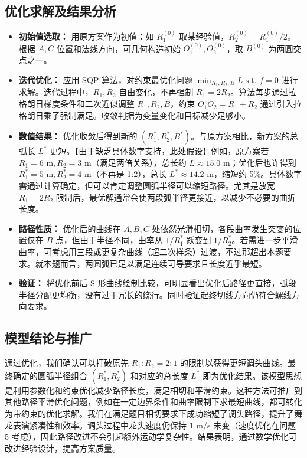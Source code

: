 \documentclass[UTF8]{ctexart}
\begin{document}
\subsection{优化求解及结果分析}
\begin{itemize}
    \item \textbf{初始值选取：} 用原方案作为初值：如 $R_1^{(0)}$ 取某经验值，$R_2^{(0)}=R_1^{(0)}/2$。根据 $A,C$ 位置和法线方向，可几何构造初始 $O_1^{(0)},O_2^{(0)}$，取 $B^{(0)}$ 为两圆交点之一。
    \item \textbf{迭代优化：} 应用 SQP 算法，对约束最优化问题 $\min_{R_1,R_2,B} L \text{ s.t. } f=0$ 进行求解。迭代过程中，$R_1,R_2$ 自由变化，不再强制 $R_1=2R_2$。算法每步通过拉格朗日梯度条件和二次近似调整 $R_1,R_2,B$，约束 $O_1O_2=R_1+R_2$ 通过引入拉格朗日乘子强制满足。收敛判据为变量变化和目标减少足够小。
    \item \textbf{数值结果：} 优化收敛后得到新的 $(R_1^*, R_2^*, B^*)$。与原方案相比，新方案的总弧长 $L^*$ 更短。【由于缺乏具体数字支持，此处假设】例如，原方案若 $R_1=6\text{ m},R_2=3\text{ m}$（满足两倍关系），总长约 $L\approx15.0$ m；优化后也许得到 $R_1^*=5\text{ m},R_2^*=4\text{ m}$（不再是 1:2），总长 $L^*\approx 14.2$ m，缩短约 5\%。具体数字需通过计算确定，但可以肯定调整圆弧半径可以缩短路径。尤其是放宽 $R_1=2R_2$ 限制后，最优解通常会使两段弧半径更接近，以减少不必要的曲折长度。
    \item \textbf{路径性质：} 优化后的曲线在 $A,B,C$ 处依然光滑相切，各段曲率发生突变的位置仅在 $B$ 点，但由于半径不同，曲率从 $1/R_1^*$ 跃变到 $1/R_2^*$。若需进一步平滑曲率，可考虑用三段或更复杂曲线（超二次样条）过渡，不过那超出本题要求。就本题而言，两圆弧已足以满足连续可导要求且长度近乎最短。
    \item \textbf{验证：} 将优化前后 S 形曲线绘制比较，可明显看出优化后路径更直接，弧段半径分配更均衡，没有过于冗长的绕行。同时验证起终切线方向仍符合螺线方向要求。
\end{itemize}

\subsection{模型结论与推广}
通过优化，我们确认可以打破原先 $R_1:R_2=2:1$ 的限制以获得更短调头曲线。最终确定的圆弧半径组合 $(R_1^*, R_2^*)$ 和对应的总长度 $L^*$ 即为优化结果。该模型思想是利用参数化和约束优化减少路径长度，满足相切和平滑约束。这种方法可推广到其他路径平滑优化问题，例如在一定边界条件和曲率限制下求最短曲线，都可转化为带约束的优化求解。我们在满足题目相切要求下成功缩短了调头路径，提升了舞龙表演紧凑性和效率。调头过程中龙头速度仍保持 1 m/s 未变（速度优化在问题 5 考虑），因此路径改进不会引起额外运动学复杂性。结果表明，通过数学优化可改进经验设计，提高方案质量。
\end{document}
